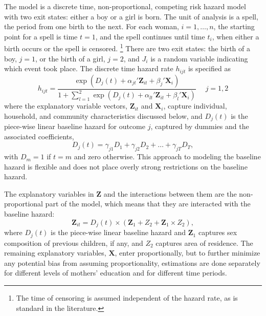 \documentclass[12pt,letterpaper]{article}
\begin{document}
The model is a discrete time, non-proportional, competing risk hazard model with two exit 
states: either a boy or a girl is born.
The unit of analysis is a spell, the period from one birth to the next.
For each woman, $i=1,\ldots,n$, the starting point for a spell is time $t=1$, and 
the spell continues until time $t_i$, when either a birth occurs or the spell 
is censored.%
\footnote{
The time of censoring is assumed independent of the hazard rate,
as is standard in the literature.
}
There are two exit states: the birth of a boy, $j=1$, or the birth of a girl, $j=2$, and 
$J_i$ is a random variable indicating which event took place.
The discrete time hazard rate $h_{ijt}$ is specified as
\begin{equation}
 h_{ijt} = \frac{\exp(D_j(t) + \alpha_{jt}'\mathbf{Z}_{it} + \beta_j'\mathbf{X}_{i})} 
 {1 + \sum_{l=1}^2 \exp(D_j(t) + \alpha_{lt}'\mathbf{Z}_{it} + \beta_l'\mathbf{X}_{i})} \: \: \; \; \;  j = 1,2
 \label{eq:hazard}
\end{equation}
where the explanatory variable vectors, $\mathbf{Z}_{it}$ and $\mathbf{X}_{i}$, capture 
individual, household, and community characteristics discussed below,
and $D_{j}(t)$ is the piece-wise linear baseline hazard for outcome $j$, captured
by dummies and the associated coefficients,
\begin{equation}
D_j(t) = \gamma_{j1} D_1 + \gamma_{j2} D_2 + \ldots + \gamma_{jT} D_T,
\end{equation}
with $D_m = 1$ if $t=m$ and zero otherwise.
This approach to modeling the baseline hazard is flexible and does not place 
overly strong restrictions on the baseline hazard.

The explanatory variables in $\mathbf{Z}$ and the interactions between them 
are the non-proportional part of the model, which means that they are
interacted with the baseline hazard:
\begin{equation}
 \mathbf{Z}_{it} = D_j(t) \times (\mathbf{Z}_1 + Z_2 + \mathbf{Z}_1 \times Z_2),
\end{equation}
where $D_j(t)$ is the piece-wise linear baseline hazard and $\mathbf{Z}_1$ captures sex 
composition of previous children, if any, and $Z_2$ captures area of residence.
The remaining explanatory variables, $\mathbf{X}$, enter proportionally,
but to further minimize any potential bias from assuming proportionality, estimations 
are done separately for different levels of mothers' education and for different 
time periods.
\end{document}
